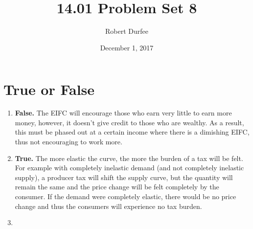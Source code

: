 \documentclass{article}
\title{ 14.01 Problem Set 8 }
\author{ Robert Durfee }
\date{ December 1, 2017 }
\begin{document}
\maketitle

\section{ True or False }

\begin{enumerate}[1.]
    \item \textbf{False.} The EIFC will encourage those who earn very little to
        earn more money, however, it doesn't give credit to those who are
        wealthy. As a result, this must be phased out at a certain income where
        there is a dimishing EIFC, thus not encouraging to work more.

    \item \textbf{True.} The more elastic the curve, the more the burden of a
        tax will be felt. For example with completely inelastic demand (and not
        completely inelastic supply), a producer tax will shift the supply
        curve, but the quantity will remain the same and the price change will
        be felt completely by the consumer. If the demand were completely
        elastic, there would be no price change and thus the consumers will
        experience no tax burden.

    \item 
\end{enumerate}
\end{document}
